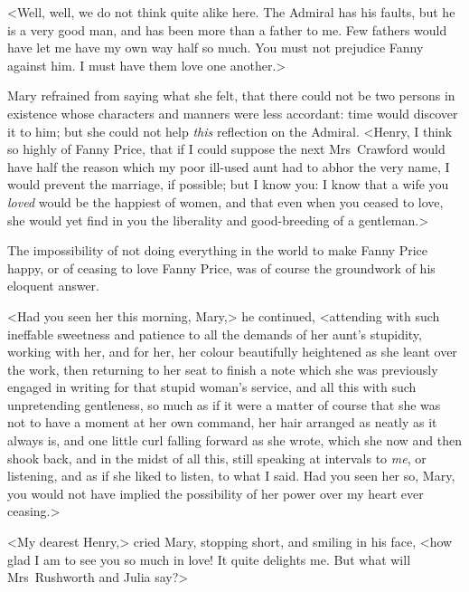 <Well, well, we do not think quite alike here. The Admiral has his faults, but he is a very good man, and has been more than a father to me. Few fathers would have let me have my own way half so much. You must not prejudice Fanny against him. I must have them love one another.>

Mary refrained from saying what she felt, that there could not be two persons in existence whose characters and manners were less accordant: time would discover it to him; but she could not help \textit{this}  reflection on the Admiral. <Henry, I think so highly of Fanny Price, that if I could suppose the next Mrs~Crawford would have half the reason which my poor ill-used aunt had to abhor the very name, I would prevent the marriage, if possible; but I know you: I know that a wife you \textit{loved}  would be the happiest of women, and that even when you ceased to love, she would yet find in you the liberality and good-breeding of a gentleman.>

The impossibility of not doing everything in the world to make Fanny Price happy, or of ceasing to love Fanny Price, was of course the groundwork of his eloquent answer.

<Had you seen her this morning, Mary,> he continued, <attending with such ineffable sweetness and patience to all the demands of her aunt's stupidity, working with her, and for her, her colour beautifully heightened as she leant over the work, then returning to her seat to finish a note which she was previously engaged in writing for that stupid woman's service, and all this with such unpretending gentleness, so much as if it were a matter of course that she was not to have a moment at her own command, her hair arranged as neatly as it always is, and one little curl falling forward as she wrote, which she now and then shook back, and in the midst of all this, still speaking at intervals to \textit{me}, or listening, and as if she liked to listen, to what I said. Had you seen her so, Mary, you would not have implied the possibility of her power over my heart ever ceasing.>

<My dearest Henry,> cried Mary, stopping short, and smiling in his face, <how glad I am to see you so much in love! It quite delights me. But what will Mrs~Rushworth and Julia say?>

